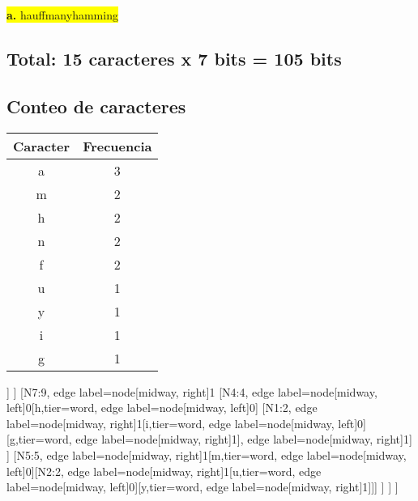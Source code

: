 \documentclass{article}
\begin{document}
	\vspace{0.5cm}
	\begin{center}
	\hspace{3cm}\colorbox{yellow}{{\textbf{a.} hauffmanyhamming}}\newline
	\subsection*{Total: 15 caracteres x 7 bits = 105 bits}
	\vspace{0.5cm}
	\subsection*{Conteo de caracteres}
\begin{tabular}{c|c}
	\textbf{Caracter} & \textbf{Frecuencia} \\
	\hline
	a & 3 \\
	m & 2 \\
	h & 2 \\
	n & 2 \\
	f & 2 \\
	u & 1 \\
	y & 1 \\
	i & 1 \\
	g & 1 \\
\end{tabular}

	\vspace{1cm}
	
	\begin{forest}
		[N8:16, for tree={parent anchor=south, child anchor=north, draw, l sep=10mm, s sep=5mm, minimum size=8mm} 
			[N6:7, edge label={node[midway, left]{0}}
				[a,tier=word, edge label={node[midway, left]{0}}]
				[N3:4, edge label={node[midway, right]{1}} [f,tier=word, edge label={node[midway, left]{0}}] [n,tier=word, edge label={node[midway, right]{1}}]]
			]
			[N7:9, edge label={node[midway, right]{1}}
				[N4:4, edge label={node[midway, left]{0}}[h,tier=word, edge label={node[midway, left]{0}}]
				[N1:2, edge label={node[midway, right]{1}}[i,tier=word, edge label={node[midway, left]{0}}][g,tier=word, edge label={node[midway, right]{1}}], edge label={node[midway, right]{1}}]
				]
				[N5:5, edge label={node[midway, right]{1}}[m,tier=word, edge label={node[midway, left]{0}}][N2:2, edge label={node[midway, right]{1}}[u,tier=word, edge label={node[midway, left]{0}}][y,tier=word, edge label={node[midway, right]{1}}]]]
				]
			]
			]
	\end{forest}
	

\end{center}
\end{document}
